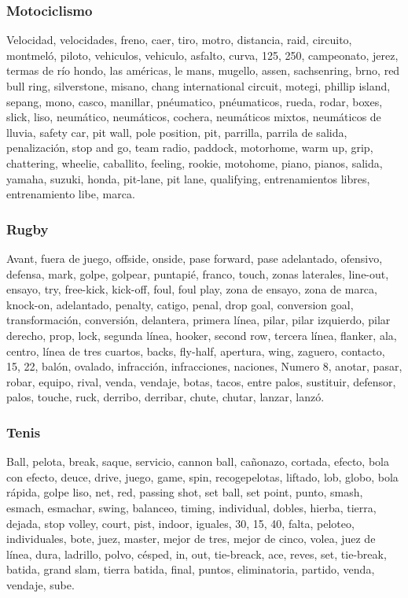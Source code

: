 \documentclass[../all.tex]{subfiles}
\begin{document}
    \subsubsection{Motociclismo}
    Velocidad, velocidades, freno, caer, tiro, motro, distancia, raid, circuito, montmeló, piloto, vehiculos, vehiculo, asfalto, curva, 125, 250, campeonato, jerez, termas de río hondo, las américas, le mans, mugello, assen, sachsenring, brno, red bull ring, silverstone, misano, chang international circuit, motegi, phillip island, sepang, mono, casco, manillar, pnéumatico, pnéumaticos, rueda, rodar, boxes, slick, liso, neumático, neumáticos, cochera, neumáticos mixtos, neumáticos de lluvia, safety car, pit wall, pole position, pit, parrilla, parrila de salida, penalización, stop and go, team radio, paddock, motorhome, warm up, grip, chattering, wheelie, caballito, feeling, rookie, motohome, piano, pianos, salida, yamaha, suzuki, honda, pit-lane, pit lane, qualifying, entrenamientos libres, entrenamiento libe, marca.
    \subsubsection{Rugby}
    Avant, fuera de juego, offside, onside, pase forward, pase adelantado, ofensivo, defensa, mark, golpe, golpear, puntapié, franco, touch, zonas laterales, line-out, ensayo, try, free-kick, kick-off, foul, foul play, zona de ensayo, zona de marca, knock-on, adelantado, penalty, catigo, penal, drop goal, conversion goal, transformación, conversión, delantera, primera línea, pilar, pilar izquierdo, pilar derecho, prop, lock, segunda línea, hooker, second row, tercera línea, flanker, ala, centro, línea de tres cuartos, backs, fly-half, apertura, wing, zaguero, contacto, 15, 22, balón, ovalado, infracción, infracciones, naciones, Numero 8, anotar, pasar, robar, equipo, rival, venda, vendaje, botas, tacos, entre palos, sustituir, defensor, palos, touche, ruck, derribo, derribar, chute, chutar, lanzar, lanzó.
    \subsubsection{Tenis}
    Ball, pelota, break, saque, servicio, cannon ball, cañonazo, cortada, efecto, bola con efecto, deuce, drive, juego, game, spin, recogepelotas, liftado, lob, globo, bola rápida, golpe liso, net, red, passing shot, set ball, set point, punto, smash, esmach, esmachar, swing, balanceo, timing, individual, dobles, hierba, tierra, dejada, stop volley, court, pist, indoor, iguales, 30, 15, 40, falta, peloteo, individuales, bote, juez, master, mejor de tres, mejor de cinco, volea, juez de línea, dura, ladrillo, polvo, césped, in, out, tie-breack, ace, reves, set, tie-break, batida, grand slam, tierra batida, final, puntos, eliminatoria, partido, venda, vendaje, sube.
\end{document}
